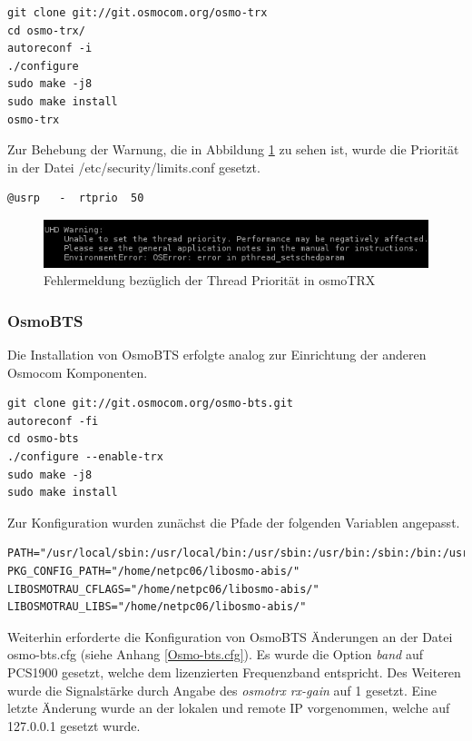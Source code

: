 \begin{lstlisting}
git clone git://git.osmocom.org/osmo-trx
cd osmo-trx/
autoreconf -i
./configure
sudo make -j8
sudo make install
osmo-trx	
\end{lstlisting}

Zur Behebung der Warnung, die in Abbildung \ref{fig:UHDWarnung} zu sehen ist, wurde die Priorität in der Datei /etc/security/limits.conf gesetzt.

\begin{lstlisting}
@usrp   -  rtprio  50
\end{lstlisting}

\begin{figure}[h] %
\centering
\includegraphics[width=15cm]{includes/uhd_usrp_warnung}
\caption{Fehlermeldung bezüglich der Thread Priorität in osmoTRX}
\label{fig:UHDWarnung}
\end{figure}

\subsubsection{OsmoBTS}
Die Installation von OsmoBTS erfolgte analog zur Einrichtung der anderen Osmocom Komponenten.

\begin{lstlisting}
git clone git://git.osmocom.org/osmo-bts.git
autoreconf -fi
cd osmo-bts
./configure --enable-trx
sudo make -j8
sudo make install
\end{lstlisting}

Zur Konfiguration wurden zunächst die Pfade der folgenden Variablen angepasst.

\begin{lstlisting}
PATH="/usr/local/sbin:/usr/local/bin:/usr/sbin:/usr/bin:/sbin:/bin:/usr/games:/usr/local/games"
PKG_CONFIG_PATH="/home/netpc06/libosmo-abis/"
LIBOSMOTRAU_CFLAGS="/home/netpc06/libosmo-abis/"
LIBOSMOTRAU_LIBS="/home/netpc06/libosmo-abis/"
\end{lstlisting}

Weiterhin erforderte die Konfiguration von OsmoBTS Änderungen an der Datei osmo-bts.cfg (siehe Anhang \ref{Osmo-bts.cfg}). Es wurde die Option \textit{band} auf PCS1900 gesetzt, welche dem lizenzierten Frequenzband entspricht. Des Weiteren wurde    die Signalstärke durch Angabe des \textit{osmotrx rx-gain} auf 1 gesetzt. Eine letzte Änderung wurde an der lokalen und remote IP vorgenommen, welche auf 127.0.0.1 gesetzt wurde. \\

